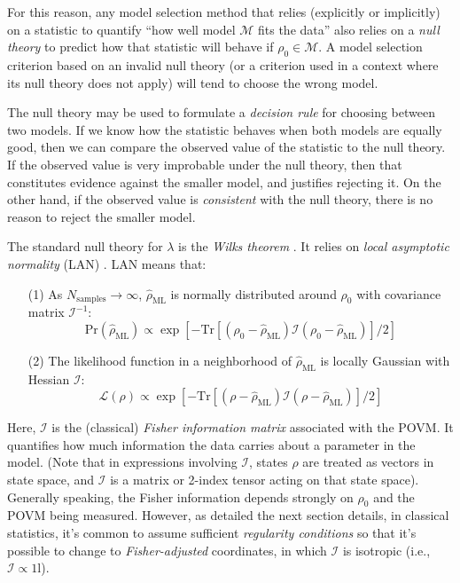 \documentclass[aps,pra, twocolumn]{revtex4-1}
\newcommand{\M}{\mathcal{M}}
\newcommand{\Id}{\mathbb{I}}
\def\Id{1\!\mathrm{l}}
\newcommand{\Fi}{\mathcal{I}}
\newcommand{\rhohat}{\hat{\rho}}
\begin{document}
For this reason, any model selection method that relies (explicitly or implicitly) on a statistic to quantify ``how well model $\M$ fits the data'' also relies on a \emph{null theory} to predict how that statistic will behave if $\rho_{0} \in \M$.  A model selection criterion based on an invalid null theory (or a criterion used in a context where its null theory does not apply) will tend to choose the wrong model.

The null theory may be used to formulate a \emph{decision rule} for choosing between two models. If we know how the statistic behaves when both models are equally good, then we can compare the observed value of the statistic to the null theory. If the observed value is very improbable under the null theory, then that constitutes evidence against the smaller model, and justifies rejecting it. On the other hand, if the observed value is \emph{consistent} with the null theory, there is no reason to reject the smaller model.

The standard null theory for $\lambda$ is the \emph{Wilks theorem} \cite{Wilks1938}. It relies on \emph{local asymptotic normality} (LAN) \cite{LeCam1970, LeCam1956}. LAN means that:
\begin{itemize}[nosep]
\item[(1)] As $N_{\mathrm{samples}}\rightarrow \infty$,  $\rhohat_{\mathrm{ML}}$ is normally distributed around $\rho_{0}$ with covariance matrix $\Fi^{-1}$:
\begin{equation}
\label{eq:landist}
\mathrm{Pr}(\rhohat_{\mathrm{ML}}) \propto \exp\left[-\mathrm{Tr}[(\rho_{0} - \rhohat_{\mathrm{ML}})\mathcal{I}(\rho_{0} - \rhohat_{\mathrm{ML}})]/2\right]
\end{equation}
\item[(2)]The likelihood function in a neighborhood of $\rhohat_{\mathrm{ML}}$ is locally Gaussian with Hessian $\Fi$:
\begin{equation}
\label{eq:lanl}
\mathcal{L}(\rho) \propto \exp\left[-\mathrm{Tr}[(\rho - \rhohat_{\mathrm{ML}})\mathcal{I}(\rho - \rhohat_{\mathrm{ML}})]/2\right]
\end{equation}
\end{itemize}
Here, $\Fi$ is the (classical) \emph{Fisher information matrix} associated with the POVM. It quantifies how much information the data carries about a parameter in the model.  (Note that in expressions involving $\mathcal{I}$, states $\rho$ are treated as vectors in state space, and $\mathcal{I}$ is a matrix or 2-index tensor acting on that state space). Generally speaking, the Fisher information depends strongly on $\rho_{0}$ and the POVM being measured. However, as detailed the next section details, in classical statistics, it's common to assume sufficient \emph{regularity conditions} so that it's possible to change to \emph{Fisher-adjusted} coordinates, in which $\mathcal{I}$ is isotropic (i.e., $\mathcal{I} \propto \Id$).
\end{document}
